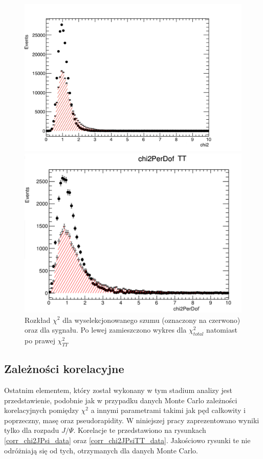 \begin{figure}[H]    
\begin{minipage}[t]{0.6\textwidth}
\includegraphics[width=\linewidth]{rozdzial6/jpsi_chi2_sPlot.png}
\end{minipage}
\hspace{\fill}
\begin{minipage}[t]{0.5\textwidth}
\includegraphics[width=\linewidth]{rozdzial6/jpsi_chi2TT_sPlot.png}
\end{minipage}
\caption{Rozkład $\chi^2$ dla wyselekcjonowanego szumu (oznaczony na czerwono) oraz dla sygnału. Po lewej zamieszczono wykres dla $\chi^2_{total}$ natomiast po prawej $\chi_{TT}^2$} \label{chi2sPlot}
\end{figure} 

\subsection{Zależności korelacyjne}
Ostatnim elementem, który został wykonany w tym stadium analizy jest przedstawienie, podobnie jak w przypadku danych Monte Carlo zależności korelacyjnych pomiędzy $\chi^2$ a innymi parametrami takimi jak pęd całkowity i poprzeczny, masę oraz pseudorapidity. W niniejszej  pracy zaprezentowano wyniki tylko dla rozpadu $J / \Psi$. Korelacje te przedstawiono na rysunkach \ref{corr_chi2JPsi_data} oraz \ref{corr_chi2JPsiTT_data}. Jakościowo rysunki te nie odróżniają się od tych, otrzymanych dla danych Monte Carlo. 

